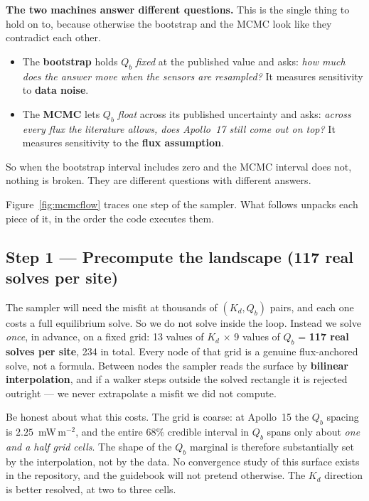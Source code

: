 \documentclass[11pt]{report}
\begin{document}
\begin{keypt}
\textbf{The two machines answer different questions.} This is the single
thing to hold on to, because otherwise the bootstrap and the MCMC look like
they contradict each other.
\begin{itemize}[leftmargin=1.4em,itemsep=2pt]
\item The \textbf{bootstrap} holds $Q_b$ \emph{fixed} at the published value
  and asks: \emph{how much does the answer move when the sensors are
  resampled?} It measures sensitivity to \textbf{data noise}.
\item The \textbf{MCMC} lets $Q_b$ \emph{float} across its published
  uncertainty and asks: \emph{across every flux the literature allows, does
  Apollo~17 still come out on top?} It measures sensitivity to the
  \textbf{flux assumption}.
\end{itemize}
So when the bootstrap interval includes zero and the MCMC interval does not,
nothing is broken. They are different questions with different answers.
\end{keypt}

\noindent Figure~\ref{fig:mcmcflow} traces one step of the sampler. What
follows unpacks each piece of it, in the order the code executes them.

\subsection*{Step 1 --- Precompute the landscape (117 real solves per site)}
The sampler will need the misfit at thousands of $(K_d,Q_b)$ pairs, and each
one costs a full equilibrium solve. So we do not solve inside the loop.
Instead we solve \emph{once}, in advance, on a fixed grid: 13 values of $K_d$
$\times$ 9 values of $Q_b$ = \textbf{117 real solves per site}, 234 in total.
Every node of that grid is a genuine flux-anchored solve, not a formula.
Between nodes the sampler reads the surface by \textbf{bilinear
interpolation}, and if a walker steps outside the solved rectangle it is
rejected outright --- we never extrapolate a misfit we did not compute.

\begin{warn}
Be honest about what this costs. The grid is coarse: at Apollo~15 the $Q_b$
spacing is $2.25$~mW\,m$^{-2}$, and the entire 68\% credible interval in
$Q_b$ spans only about \emph{one and a half grid cells}. The shape of the
$Q_b$ marginal is therefore substantially set by the interpolation, not by
the data. No convergence study of this surface exists in the repository, and
the guidebook will not pretend otherwise. The $K_d$ direction is better
resolved, at two to three cells.
\end{warn}
\end{document}
